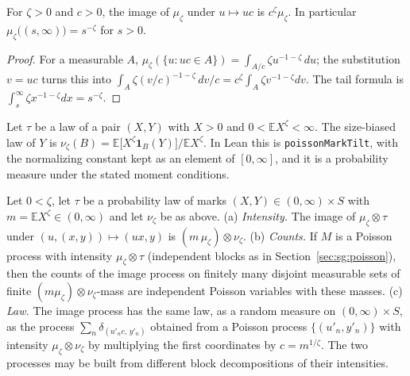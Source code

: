 \begin{lemma}\label{lem:sg:pd-homogeneity}
  \leanok
For $\zeta>0$ and $c>0$, the image of $\mu_\zeta$ under $u\mapsto uc$ is $c^{\zeta}\mu_\zeta$. In particular $\mu_\zeta\big((s,\infty)\big)=s^{-\zeta}$ for $s>0$.
\end{lemma}

\begin{proof}
  \leanok
For a measurable $A$, $\mu_\zeta(\{u:uc\in A\})=\int_{A/c}\zeta u^{-1-\zeta}\,du$; the substitution $v=uc$ turns this into $\int_A\zeta (v/c)^{-1-\zeta}\,dv/c=c^{\zeta}\int_A\zeta v^{-1-\zeta}dv$. The tail formula is $\int_s^\infty\zeta x^{-1-\zeta}dx=s^{-\zeta}$.
\end{proof}

\begin{definition}\label{def:sg:pd-tilt}
  \leanok
Let $\tau$ be a law of a pair $(X,Y)$ with $X>0$ and $0<\mathbb EX^\zeta<\infty$. The size-biased law of $Y$ is $\nu_\zeta(B)=\mathbb E\big[X^\zeta\mathbf 1_B(Y)\big]\big/\mathbb EX^\zeta$. In Lean this is \texttt{poissonMarkTilt}, with the normalizing constant kept as an element of $[0,\infty]$, and it is a probability measure under the stated moment conditions.
\end{definition}

\begin{theorem}\label{thm:sg:pd-marking}
  \leanok
Let $0<\zeta$, let $\tau$ be a probability law of marks $(X,Y)\in(0,\infty)\times S$ with $m=\mathbb EX^\zeta\in(0,\infty)$ and let $\nu_\zeta$ be as above.
(a) \emph{Intensity.} The image of $\mu_\zeta\otimes\tau$ under $(u,(x,y))\mapsto(ux,y)$ is $(m\,\mu_\zeta)\otimes\nu_\zeta$.
(b) \emph{Counts.} If $M$ is a Poisson process with intensity $\mu_\zeta\otimes\tau$ (independent blocks as in Section~\ref{sec:sg:poisson}), then the counts of the image process on finitely many disjoint measurable sets of finite $(m\mu_\zeta)\otimes\nu_\zeta$-mass are independent Poisson variables with these masses.
(c) \emph{Law.} The image process has the same law, as a random measure on $(0,\infty)\times S$, as the process $\sum_n\delta_{(u'_nc,\,y'_n)}$ obtained from a Poisson process $\{(u'_n,y'_n)\}$ with intensity $\mu_\zeta\otimes\nu_\zeta$ by multiplying the first coordinates by $c=m^{1/\zeta}$. The two processes may be built from different block decompositions of their intensities.
\end{theorem}

